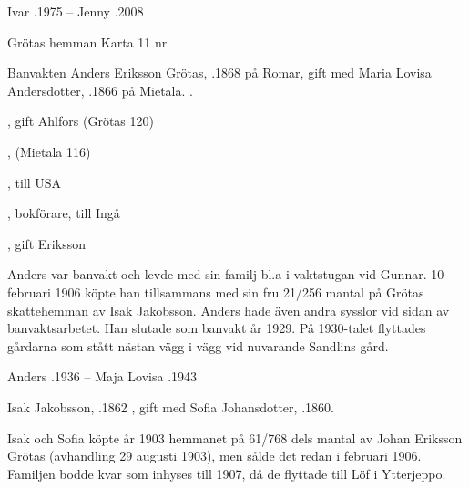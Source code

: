 Ivar .1975  --  Jenny .2008



 		Grötas hemman 	Karta 11     nr 


Banvakten Anders Eriksson Grötas, .1868 på Romar, gift med Maria	Lovisa Andersdotter, .1866 på Mietala.                .
\begin{jhchildren}
  \item {}, gift Ahlfors (Grötas 120)
  \item {}
  \item {}, (Mietala 116)
  \item {}, till USA
  \item {}
  \item {}, bokförare, till Ingå
  \item {}, gift Eriksson
\end{jhchildren}
Anders var banvakt och levde med sin familj bl.a i vaktstugan vid Gunnar. 10 februari 1906 köpte han tillsammans med sin fru 21/256 mantal på Grötas skattehemman av Isak Jakobsson. Anders hade även andra sysslor vid sidan av banvaktsarbetet. Han slutade som banvakt år 1929. På 1930-talet flyttades gårdarna som stått nästan vägg i vägg vid nuvarande Sandlins gård.

Anders .1936  --  Maja Lovisa .1943


Isak Jakobsson, .1862 , gift med Sofia Johansdotter, .1860.
\begin{jhchildren}
  \item {}
  \item {}
  \item {}
  \item {}
  \item {}
\end{jhchildren}
Isak och Sofia köpte år 1903 hemmanet på 61/768 dels mantal av Johan Eriksson Grötas (avhandling 29 augusti 1903), men sålde det redan i februari 1906. Familjen bodde kvar som inhyses till 1907, då de flyttade till Löf i Ytterjeppo.


